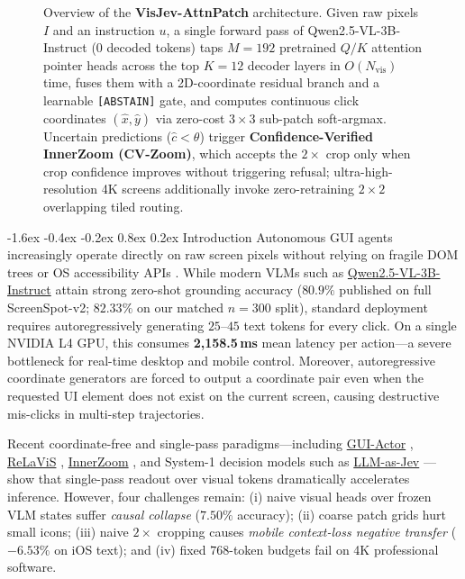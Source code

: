 \documentclass[10pt,twocolumn,letterpaper]{article}
\makeatletter
\renewcommand\section{\@startsection{section}{1}{\z@}%
  {-1.6ex \@plus -0.4ex \@minus -0.2ex}%
  {0.8ex \@plus 0.2ex}%
  {\normalfont\large\bfseries\color{navy}}}
\makeatother
\begin{document}
\begin{figure}[t]
{\begin{tikzpicture}
\end{tikzpicture}%
}
\caption{Overview of the \textbf{VisJev-AttnPatch} architecture. Given raw pixels $I$ and an instruction $u$, a single forward pass of Qwen2.5-VL-3B-Instruct ($0$ decoded tokens) taps $M{=}192$ pretrained $Q/K$ attention pointer heads across the top $K{=}12$ decoder layers in $O(N_{\mathrm{vis}})$ time, fuses them with a 2D-coordinate residual branch and a learnable \texttt{[ABSTAIN]} gate, and computes continuous click coordinates $(\hat{x},\hat{y})$ via zero-cost $3{\times}3$ sub-patch soft-argmax. Uncertain predictions ($\hat{c} < \theta$) trigger \textbf{Confidence-Verified InnerZoom (CV-Zoom)}, which accepts the $2{\times}$ crop only when crop confidence improves without triggering refusal; ultra-high-resolution 4K screens additionally invoke zero-retraining $2{\times}2$ overlapping tiled routing.}
\label{fig:arch}
\end{figure}

\section{Introduction}
Autonomous GUI agents increasingly operate directly on raw screen pixels without relying on fragile DOM trees or OS accessibility APIs \cite{guiactor,guirlvg,osatlas}. While modern VLMs such as \href{https://qwenlm.github.io/blog/qwen2.5-vl/}{Qwen2.5-VL-3B-Instruct} \cite{qwen25vl} attain strong zero-shot grounding accuracy ($80.9\%$ published on full ScreenSpot-v2; $82.33\%$ on our matched $n{=}300$ split), standard deployment requires autoregressively generating $25\text{--}45$ text tokens for every click. On a single NVIDIA L4 GPU, this consumes \textbf{2,158.5\,ms} mean latency per action---a severe bottleneck for real-time desktop and mobile control. Moreover, autoregressive coordinate generators are forced to output a coordinate pair even when the requested UI element does not exist on the current screen, causing destructive mis-clicks in multi-step trajectories.

Recent coordinate-free and single-pass paradigms---including \href{https://github.com/microsoft/GUI-Actor}{GUI-Actor} \cite{guiactor}, \href{https://arxiv.org/abs/2610.05185}{ReLaViS} \cite{relavis}, \href{https://aclanthology.org/2026.emnlp-main.843/}{InnerZoom} \cite{innerzoom}, and System-1 decision models such as \href{https://arxiv.org/abs/2610.02076}{LLM-as-Jev} \cite{llmasjev}---show that single-pass readout over visual tokens dramatically accelerates inference. However, four challenges remain: (i) naive visual heads over frozen VLM states suffer \emph{causal collapse} ($7.50\%$ accuracy); (ii) coarse patch grids hurt small icons; (iii) naive $2{\times}$ cropping causes \emph{mobile context-loss negative transfer} ($-6.53\%$ on iOS text); and (iv) fixed $768$-token budgets fail on 4K professional software.
\end{document}
